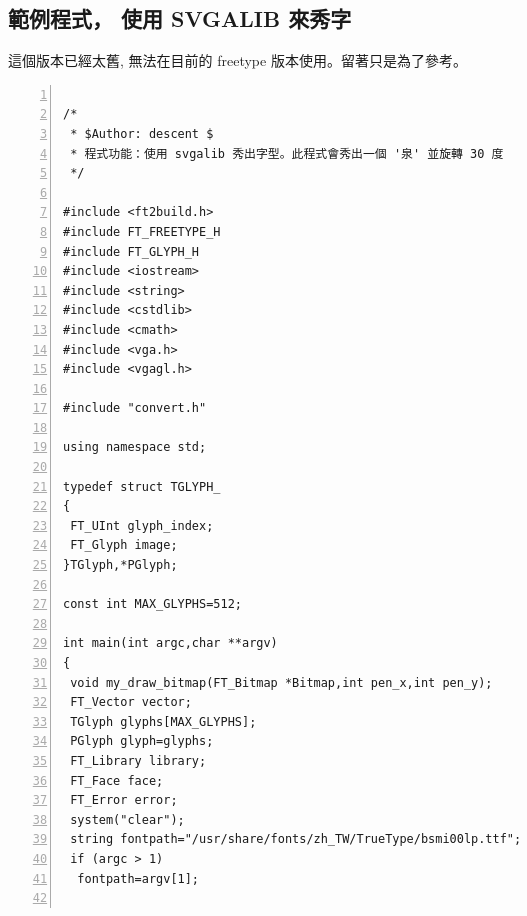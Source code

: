 \documentclass[12pt,a4]{article}
\begin{document}
\begin{CJK}{UTF8}{bsmi}



\newpage


\newpage
\section{範例程式， 使用 SVGALIB 來秀字}
這個版本已經太舊, 無法在目前的 freetype 版本使用。留著只是為了參考。

\begin{Verbatim}[commandchars=@\^?,numbers=left]

/*
 * $Author: descent $
 * 程式功能：使用 svgalib 秀出字型。此程式會秀出一個 '泉' 並旋轉 30 度
 */
	
#include <ft2build.h>
#include FT_FREETYPE_H
#include FT_GLYPH_H
#include <iostream>
#include <string>
#include <cstdlib>
#include <cmath>
#include <vga.h>
#include <vgagl.h>

#include "convert.h"

using namespace std;

typedef struct TGLYPH_
{
 FT_UInt glyph_index;
 FT_Glyph image;
}TGlyph,*PGlyph;

const int MAX_GLYPHS=512;

int main(int argc,char **argv)
{
 void my_draw_bitmap(FT_Bitmap *Bitmap,int pen_x,int pen_y);
 FT_Vector vector;
 TGlyph glyphs[MAX_GLYPHS];
 PGlyph glyph=glyphs;
 FT_Library library;
 FT_Face face;
 FT_Error error;
 system("clear");
 string fontpath="/usr/share/fonts/zh_TW/TrueType/bsmi00lp.ttf";
 if (argc > 1)
  fontpath=argv[1];


\end{Verbatim}
\end{CJK}
\end{document}
